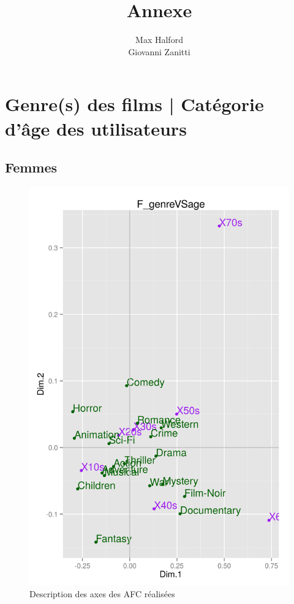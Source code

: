 \documentclass[11pt]{article}
\title{\textbf{Annexe}}
\author{Max Halford\\
		Giovanni Zanitti\\}
\date{}
\begin{document}
\maketitle

\pagebreak

\section{Genre(s) des films | Catégorie d'âge des utilisateurs}
\subsection{Femmes}
\begin{figure}[htd]
\centering
\includegraphics[scale=0.65]{./images/F_genreVSage}
\caption{Description des axes des AFC réalisées}
\end{figure}\bigskip
\
\end{document}
